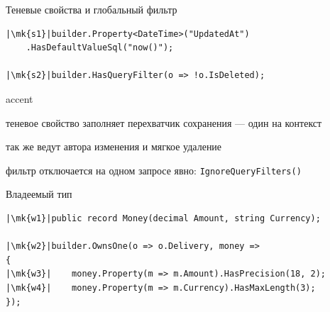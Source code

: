 \documentclass[aspectratio=169,10pt,t]{beamer}
\newcommand{\codesm}{\ttfamily\fontsize{7.6}{9.0}\selectfont}
\newcommand{\mk}[1]{\tikz[remember picture,overlay]\coordinate (#1) at (0,0.55ex);}
\begin{document}
\begin{frame}[fragile]{Теневые свойства и глобальный фильтр}
  \slidetop

\begin{lstlisting}[style=csharp,basicstyle=\codesm,escapechar=|]
|\mk{s1}|builder.Property<DateTime>("UpdatedAt")
    .HasDefaultValueSql("now()");

|\mk{s2}|builder.HasQueryFilter(o => !o.IsDeleted);
\end{lstlisting}

  \slidegap
  \begin{cbul}{accent}
    \item теневое свойство заполняет перехватчик сохранения --- один на контекст
    \item так же ведут автора изменения и мягкое удаление
    \item фильтр отключается на одном запросе явно: \texttt{IgnoreQueryFilters()}
  \end{cbul}
\end{frame}

\begin{frame}[fragile]{Владеемый тип}
  \slidetop

\begin{lstlisting}[style=csharp,basicstyle=\codesm,escapechar=|]
|\mk{w1}|public record Money(decimal Amount, string Currency);

|\mk{w2}|builder.OwnsOne(o => o.Delivery, money =>
{
|\mk{w3}|    money.Property(m => m.Amount).HasPrecision(18, 2);
|\mk{w4}|    money.Property(m => m.Currency).HasMaxLength(3);
});
\end{lstlisting}

  \slidegap
\end{frame}
\end{document}
